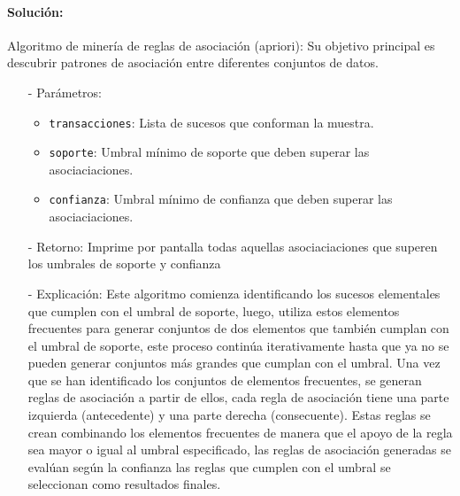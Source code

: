 \documentclass[a4paper, 12pt]{article}
\begin{document}
	\paragraph{Solución:}
			Algoritmo de minería de reglas de asociación (apriori): Su objetivo principal es descubrir patrones de asociación entre diferentes conjuntos de datos.
			\begin{itemize}
				\item[-] Parámetros:
				\begin{itemize}
					\item \texttt{transacciones}: Lista de sucesos que conforman la muestra.
					\item \texttt{soporte}: Umbral mínimo de soporte que deben superar las asociaciaciones.
					\item \texttt{confianza}: Umbral mínimo de confianza que deben superar las asociaciaciones.
				\end{itemize}
				
				\item[-] Retorno: Imprime por pantalla todas aquellas asociaciaciones que superen los umbrales de soporte y confianza
				
				\item[-] Explicación: Este algoritmo comienza identificando los sucesos elementales que cumplen con el umbral de soporte, luego, utiliza estos elementos frecuentes para generar conjuntos de dos elementos que también cumplan con el umbral de soporte, este proceso continúa iterativamente hasta que ya no se pueden generar conjuntos más grandes que cumplan con el umbral. Una vez que se han identificado los conjuntos de elementos frecuentes, se generan reglas de asociación a partir de ellos, cada regla de asociación tiene una parte izquierda (antecedente) y una parte derecha (consecuente). Estas reglas se crean combinando los elementos frecuentes de manera que el apoyo de la regla sea mayor o igual al umbral especificado, las reglas de asociación generadas se evalúan según la confianza las reglas que cumplen con el umbral se seleccionan como resultados finales.

			\end{itemize}
\end{document}
